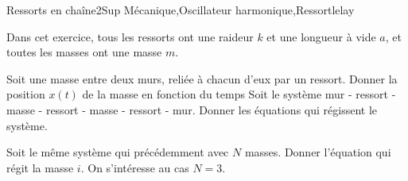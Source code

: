 
\begin{exercise}{Ressorts en chaîne}{2}{Sup}
{Mécanique,Oscillateur harmonique,Ressort}{lelay}

Dans cet exercice, tous les ressorts ont une raideur $k$ et une longueur à vide $a$, et toutes les masses ont une masse $m$.
\begin{questions}
    \question Soit une masse entre deux murs, reliée à chacun d'eux par un ressort. Donner la position $x(t)$ de la masse en fonction du temps
    \question Soit le système mur - ressort - masse - ressort - masse - ressort - mur. Donner les équations qui régissent le système.
    \question Soit le même système qui précédemment avec $N$ masses. Donner l'équation qui régit la masse $i$.
    \question On s'intéresse au cas $N=3$. %
\end{questions}
\end{exercise}
